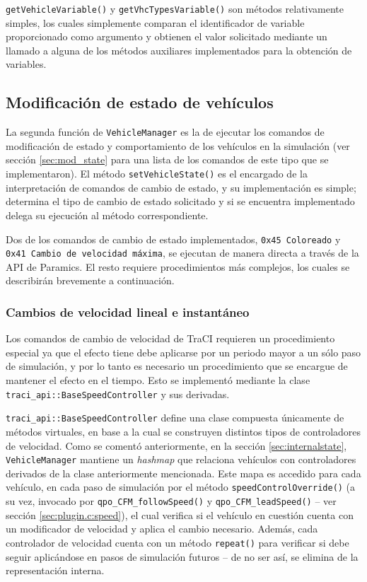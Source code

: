 \texttt{getVehicleVariable()} y \texttt{getVhcTypesVariable()} son métodos relativamente simples, los cuales simplemente comparan el identificador de variable proporcionado como argumento y obtienen el valor solicitado mediante un llamado a alguna de los métodos auxiliares implementados para la obtención de variables.

\subsection{Modificación de estado de vehículos}

La segunda función de \texttt{VehicleManager} es la de ejecutar los comandos de modificación de estado y comportamiento de los vehículos en la simulación (ver sección \ref{sec:mod_state} para una lista de los comandos de este tipo que se implementaron). El método \texttt{setVehicleState()} es el encargado de la interpretación de comandos de cambio de estado, y su implementación es simple; determina el tipo de cambio de estado solicitado y si se encuentra implementado delega su ejecución al método correspondiente.

Dos de los comandos de cambio de estado implementados, \texttt{0x45 Coloreado} y \texttt{0x41 Cambio de velocidad máxima}, se ejecutan de manera directa a través de la API de Paramics. El resto requiere procedimientos más complejos, los cuales se describirán brevemente a continuación.

\subsubsection{Cambios de velocidad lineal e instantáneo}\label{sec:speedoverride}

Los comandos de cambio de velocidad de TraCI requieren un procedimiento especial ya que el efecto tiene debe aplicarse por un periodo mayor a un sólo paso de simulación, y por lo tanto es necesario un procedimiento que se encargue de mantener el efecto en el tiempo. Esto se implementó mediante la clase \texttt{traci\_api::BaseSpeedController} y sus derivadas.

\texttt{traci\_api::BaseSpeedController} define una clase compuesta únicamente de métodos virtuales, en base a la cual se construyen distintos tipos de controladores de velocidad. Como se comentó anteriormente, en la sección \ref{sec:internalstate}, \texttt{VehicleManager} mantiene un \emph{hashmap} que relaciona vehículos con controladores derivados de la clase anteriormente mencionada. Este mapa es accedido para cada vehículo, en cada paso de simulación por el método \texttt{speedControlOverride()} (a su vez, invocado por \texttt{qpo\_CFM\_followSpeed()} y \texttt{qpo\_CFM\_leadSpeed()} -- ver sección \ref{sec:plugin.c:speed}), el cual verifica si el vehículo en cuestión cuenta con un modificador de velocidad y aplica el cambio necesario. Además, cada controlador de velocidad cuenta con un método \texttt{repeat()} para verificar si debe seguir aplicándose en pasos de simulación futuros -- de no ser así, se elimina de la representación interna.

